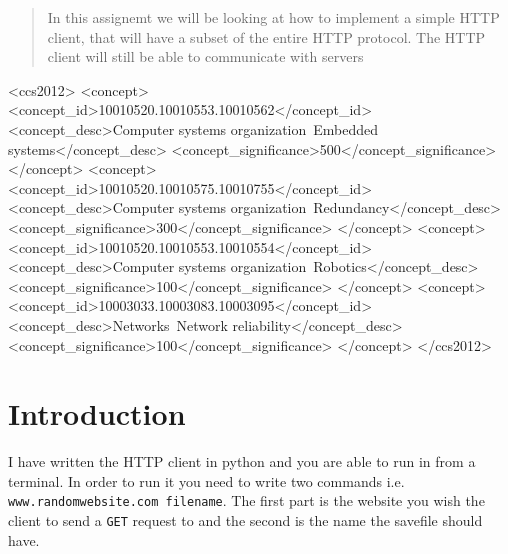 \documentclass{sig-alternate-05-2015}
\begin{document}
\maketitle
\begin{abstract}
In this assignemt we will be looking at how to implement a simple HTTP client, that will have a subset of the entire HTTP protocol. The HTTP client will still be able to communicate with servers
\end{abstract}


%
%
\begin{CCSXML}
<ccs2012>
 <concept>
  <concept_id>10010520.10010553.10010562</concept_id>
  <concept_desc>Computer systems organization~Embedded systems</concept_desc>
  <concept_significance>500</concept_significance>
 </concept>
 <concept>
  <concept_id>10010520.10010575.10010755</concept_id>
  <concept_desc>Computer systems organization~Redundancy</concept_desc>
  <concept_significance>300</concept_significance>
 </concept>
 <concept>
  <concept_id>10010520.10010553.10010554</concept_id>
  <concept_desc>Computer systems organization~Robotics</concept_desc>
  <concept_significance>100</concept_significance>
 </concept>
 <concept>
  <concept_id>10003033.10003083.10003095</concept_id>
  <concept_desc>Networks~Network reliability</concept_desc>
  <concept_significance>100</concept_significance>
 </concept>
</ccs2012>
\end{CCSXML}



%
%

%
%




\section{Introduction}
I have written the HTTP client in python and you are able to run in from a terminal. In order to run it you need to write two commands i.e. \texttt{www.randomwebsite.com filename}. The first part is the website you wish the client to send a \texttt{GET} request to and the second is the name the savefile should have.
\end{document}
